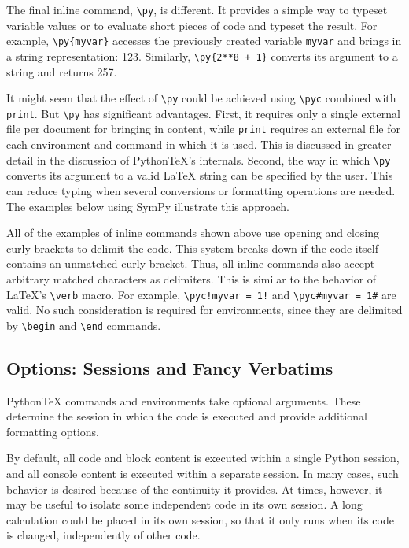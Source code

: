 \documentclass[letterpaper,compsoc,twoside]{IEEEtran}
\begin{document}
The final inline command, \texttt{\textbackslash{}py}, is different.  It provides a simple way
to typeset variable values or to evaluate short pieces of code and typeset
the result.  For example, \texttt{\textbackslash{}py\{myvar\}} accesses the previously created
variable \texttt{myvar} and brings in a string representation:  123.  Similarly, \texttt{\textbackslash{}py\{2**8 + 1\}} converts its argument to a string and returns
257.

It might seem that the effect of \texttt{\textbackslash{}py} could be achieved using \texttt{\textbackslash{}pyc}
combined with \texttt{print}.  But \texttt{\textbackslash{}py} has significant advantages.  First,
it requires only a single external file per document for bringing in content,
while \texttt{print} requires an external file for each environment and command in
which it is used.  This is discussed in greater detail in the discussion of
PythonTeX's internals.  Second, the way in which \texttt{\textbackslash{}py} converts its argument
to a valid LaTeX string can be specified by the user.  This can reduce typing
when several conversions or formatting operations are needed.  The examples
below using SymPy illustrate this approach.

All of the examples of inline commands shown above use opening and closing
curly brackets to delimit the code.  This system breaks down if the code
itself contains an unmatched curly bracket.  Thus, all inline commands
also accept arbitrary matched characters as delimiters.  This is similar
to the behavior of LaTeX's \texttt{\textbackslash{}verb} macro.  For example,
\texttt{\textbackslash{}pyc!myvar = 1!} and \texttt{\textbackslash{}pyc\#myvar = 1\#} are valid.  No such
consideration is required for environments, since they are delimited
by \texttt{\textbackslash{}begin} and \texttt{\textbackslash{}end} commands.

\subsection{Options:  Sessions and Fancy Verbatims%
  \label{options-sessions-and-fancy-verbatims}%
}


PythonTeX commands and environments take optional arguments.  These
determine the session in which the code is executed and provide
additional formatting options.

By default, all code and block content is executed within a single
Python session, and all console content is executed within a separate
session.  In many cases, such behavior is desired because of the continuity
it provides.  At times, however, it may be useful to isolate some independent
code in its own session.  A long calculation could be placed in
its own session, so that it only runs when its code is changed, independently
of other code.
\end{document}
